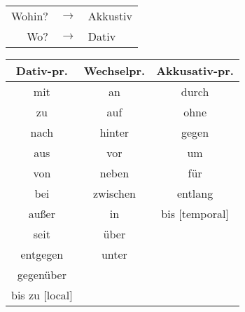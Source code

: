
\begin{tabular}{rcl}
Wohin? & $\rightarrow$ & Akkustiv \\
Wo? & $\rightarrow$ & Dativ
\end{tabular}

\begin{longtable}{|c|c|c|}
\hline
Dativ-pr. & Wechselpr. & Akkusativ-pr. \\
\hline
mit & an & durch \\
zu & auf & ohne \\
nach & hinter & gegen \\
aus & vor & um \\
von & neben & f\"ur \\
bei & zwischen & entlang \\
au\ss er & in & bis [temporal] \\
seit & \"uber & ~ \\
entgegen & unter & ~ \\
gegen\"uber & ~ & ~ \\
bis zu [local] & ~ & ~ \\
\hline
\end{longtable}
